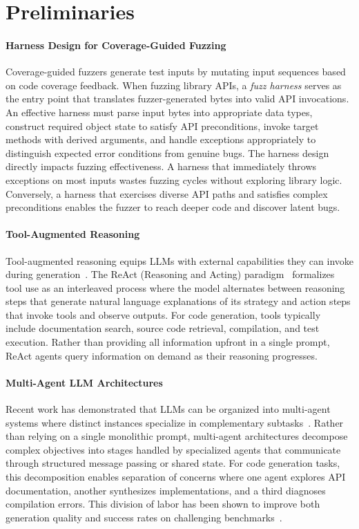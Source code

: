 
\section{Preliminaries}

\paragraph{Harness Design for Coverage-Guided Fuzzing}
Coverage-guided fuzzers generate test inputs by mutating input sequences based on code coverage feedback. When fuzzing library APIs, a \emph{fuzz harness} serves as the entry point that translates fuzzer-generated bytes into valid API invocations. An effective harness must parse input bytes into appropriate data types, construct required object state to satisfy API preconditions, invoke target methods with derived arguments, and handle exceptions appropriately to distinguish expected error conditions from genuine bugs. The harness design directly impacts fuzzing effectiveness. A harness that immediately throws exceptions on most inputs wastes fuzzing cycles without exploring library logic. Conversely, a harness that exercises diverse API paths and satisfies complex preconditions enables the fuzzer to reach deeper code and discover latent bugs.

\paragraph{Tool-Augmented Reasoning}
Tool-augmented reasoning equips LLMs with external capabilities they can invoke during generation~\cite{DBLP:conf/nips/SchickDDRLHZCS23:Toolformer,DBLP:conf/iclr/QinLYZYLLCTQZHT24:ToolLLM}. The ReAct (Reasoning and Acting) paradigm~\cite{DBLP:conf/iclr/YaoZYDSN023:ReAct} formalizes tool use as an interleaved process where the model alternates between reasoning steps that generate natural language explanations of its strategy and action steps that invoke tools and observe outputs. For code generation, tools typically include documentation search, source code retrieval, compilation, and test execution. Rather than providing all information upfront in a single prompt, ReAct agents query information on demand as their reasoning progresses.

\paragraph{Multi-Agent LLM Architectures}
Recent work has demonstrated that LLMs can be organized into multi-agent systems where distinct instances specialize in complementary subtasks~\cite{DBLP:journals/corr/abs-2312-13010:AgentCoder}. Rather than relying on a single monolithic prompt, multi-agent architectures decompose complex objectives into stages handled by specialized agents that communicate through structured message passing or shared state. For code generation tasks, this decomposition enables separation of concerns where one agent explores API documentation, another synthesizes implementations, and a third diagnoses compilation errors. This division of labor has been shown to improve both generation quality and success rates on challenging benchmarks~\cite{DBLP:conf/iclr/0036YZXLL0DMYZ024:AgentBench}.

